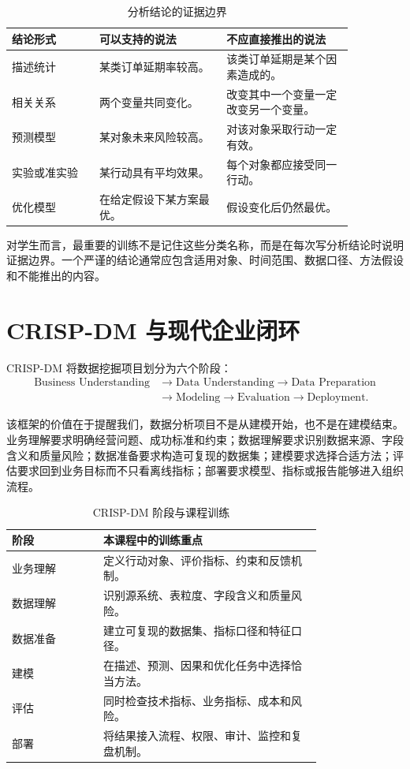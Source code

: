 \documentclass[UTF8,fontset=fandol,openany,zihao=-4]{ctexbook}
\begin{document}
\begin{table}[htbp]
\centering
\caption{分析结论的证据边界}
\begin{tabular}{p{0.22\linewidth}p{0.32\linewidth}p{0.32\linewidth}}
\toprule
结论形式 & 可以支持的说法 & 不应直接推出的说法\\
\midrule
描述统计 & 某类订单延期率较高。 & 该类订单延期是某个因素造成的。\\
相关关系 & 两个变量共同变化。 & 改变其中一个变量一定改变另一个变量。\\
预测模型 & 某对象未来风险较高。 & 对该对象采取行动一定有效。\\
实验或准实验 & 某行动具有平均效果。 & 每个对象都应接受同一行动。\\
优化模型 & 在给定假设下某方案最优。 & 假设变化后仍然最优。\\
\bottomrule
\end{tabular}
\end{table}

对学生而言，最重要的训练不是记住这些分类名称，而是在每次写分析结论时说明证据边界。一个严谨的结论通常应包含适用对象、时间范围、数据口径、方法假设和不能推出的内容。

\section{CRISP-DM 与现代企业闭环}

CRISP-DM 将数据挖掘项目划分为六个阶段：
\[
\begin{aligned}
\text{Business Understanding}
&\rightarrow
\text{Data Understanding}
\rightarrow
\text{Data Preparation}\\
&\rightarrow
\text{Modeling}
\rightarrow
\text{Evaluation}
\rightarrow
\text{Deployment}.
\end{aligned}
\]

该框架的价值在于提醒我们，数据分析项目不是从建模开始，也不是在建模结束。业务理解要求明确经营问题、成功标准和约束；数据理解要求识别数据来源、字段含义和质量风险；数据准备要求构造可复现的数据集；建模要求选择合适方法；评估要求回到业务目标而不只看离线指标；部署要求模型、指标或报告能够进入组织流程。

\begin{table}[htbp]
\centering
\caption{CRISP-DM 阶段与课程训练}
\begin{tabular}{p{0.23\linewidth}p{0.55\linewidth}}
\toprule
阶段 & 本课程中的训练重点\\
\midrule
业务理解 & 定义行动对象、评价指标、约束和反馈机制。\\
数据理解 & 识别源系统、表粒度、字段含义和质量风险。\\
数据准备 & 建立可复现的数据集、指标口径和特征口径。\\
建模 & 在描述、预测、因果和优化任务中选择恰当方法。\\
评估 & 同时检查技术指标、业务指标、成本和风险。\\
部署 & 将结果接入流程、权限、审计、监控和复盘机制。\\
\bottomrule
\end{tabular}
\end{table}
\end{document}
